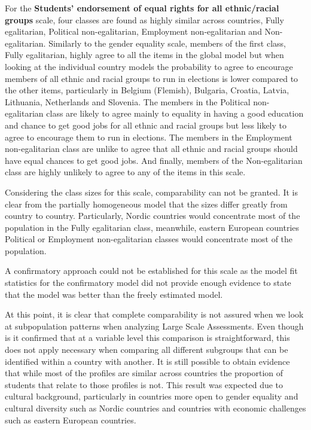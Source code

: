 \documentclass[12pt,a4paper,oneside]{reedthesis}
\begin{document}
For the \textbf{Students' endorsement of equal rights for all ethnic/racial groups} scale, four classes are found as highly similar across countries, Fully egalitarian, Political non-egalitarian, Employment non-egalitarian and Non-egalitarian. Similarly to the gender equality scale, members of the first class, Fully egalitarian, highly agree to all the items in the global model but when looking at the individual country models the probability to agree to encourage members of all ethnic and racial groups to run in elections is lower compared to the other items, particularly in Belgium (Flemish), Bulgaria, Croatia, Latvia, Lithuania, Netherlands and Slovenia. The members in the Political non-egalitarian class are likely to agree mainly to equality in having a good education and chance to get good jobs for all ethnic and racial groups but less likely to agree to encourage them to run in elections. The members in the Employment non-egalitarian class are unlike to agree that all ethnic and racial groups should have equal chances to get good jobs. And finally, members of the Non-egalitarian class are highly unlikely to agree to any of the items in this scale.

Considering the class sizes for this scale, comparability can not be granted. It is clear from the partially homogeneous model that the sizes differ greatly from country to country. Particularly, Nordic countries would concentrate most of the population in the Fully egalitarian class, meanwhile, eastern European countries Political or Employment non-egalitarian classes would concentrate most of the population.

A confirmatory approach could not be established for this scale as the model fit statistics for the confirmatory model did not provide enough evidence to state that the model was better than the freely estimated model.

At this point, it is clear that complete comparability is not assured when we look at subpopulation patterns when analyzing Large Scale Assessments. Even though is it confirmed that at a variable level this comparison is straightforward, this does not apply necessary when comparing all different subgroups that can be identified within a country with another. It is still possible to obtain evidence that while most of the profiles are similar across countries the proportion of students that relate to those profiles is not. This result was expected due to cultural background, particularly in countries more open to gender equality and cultural diversity such as Nordic countries and countries with economic challenges such as eastern European countries.
\end{document}
